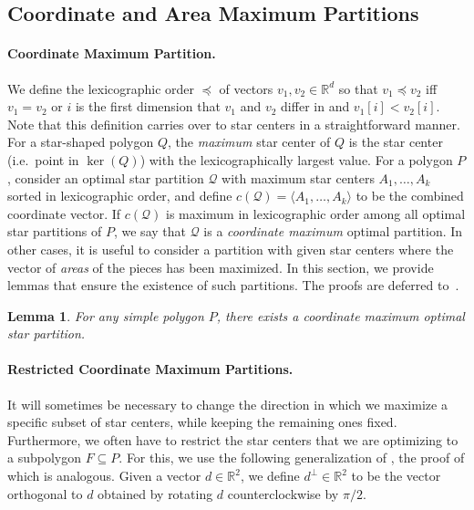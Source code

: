 \documentclass[10pt,a4paper]{article}
\newtheorem{lemma}{Lemma}[section]
\newcommand{\RR}{\mathbb{R}}
\begin{document}
\subsection{Coordinate and Area Maximum Partitions}
\label{sec:existence}

\paragraph{Coordinate Maximum Partition.}
We define the lexicographic order $\preceq$ of vectors $v_1, v_2 \in \RR^d$ so that $v_1 \preceq v_2$ iff $v_1 = v_2$ or $i$ is the first dimension that $v_1$ and $v_2$ differ in and $v_1[i] < v_2[i]$.
Note that this definition carries over to star centers in a straightforward manner.
For a star-shaped polygon $Q$, the \emph{maximum} star center of $Q$ is the star center (i.e.\ point in $\ker(Q)$) with the lexicographically largest value.
For a polygon $P$, consider an optimal star partition $\mathcal Q$ with maximum star centers $A_1,\ldots,A_k$ sorted in lexicographic order, and define $c(\mathcal Q)=\langle A_1,\ldots,A_k\rangle$ to be the combined coordinate vector.
If $c(\mathcal Q)$ is maximum in lexicographic order among all optimal star partitions of $P$, we say that $\mathcal Q$ is a \emph{coordinate maximum} optimal partition.
In other cases, it is useful to consider a partition with given star centers where the vector of \emph{areas} of the pieces has been maximized.
In this section, we provide lemmas that ensure the existence of such partitions.
The proofs are deferred to~.

\begin{lemma}\label{lem:coordmax}
For any simple polygon $P$, there exists a coordinate maximum optimal star partition.
\end{lemma}


\paragraph{Restricted Coordinate Maximum Partitions.}
It will sometimes be necessary to change the direction in which we maximize a specific subset of star centers, while keeping the remaining ones fixed.
Furthermore, we often have to restrict the star centers that we are optimizing to a subpolygon $F \subseteq P$.
For this, we use the following generalization of , the proof of which is analogous.
Given a vector $d \in \RR^2$, we define $d^\perp \in \RR^2$ to be the vector orthogonal to $d$ obtained by rotating $d$ counterclockwise by $\pi/2$.
\end{document}
